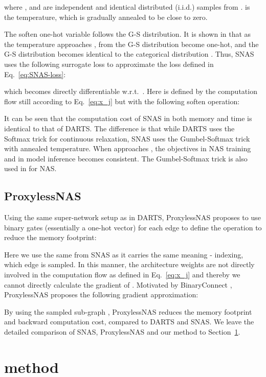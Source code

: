 \documentclass{article}
\newcommand{\neqref}{Eq.~\eqref}
\newcommand{\secref}{Section~\ref}
\begin{document}
where , and  are independent and identical distributed (i.i.d.) samples from .  is the temperature, which is gradually annealed to be close to zero.

The soften one-hot variable  follows the G-S distribution.
It is shown in \cite{Jang2016Categorical} that as the temperature  approaches ,  from the G-S distribution become one-hot, and the G-S distribution becomes identical to the categorical distribution . Thus, SNAS uses the following surrogate loss to approximate the loss defined in \neqref{eq:SNAS-loss}:

which becomes directly differentiable w.r.t.~.
Here  is defined by the computation flow still according to \neqref{eq:x_j} but with the following soften operation:



It can be seen that the computation cost of SNAS in both memory and time is identical to that of DARTS.
The difference is that while DARTS uses the Softmax trick for continuous relaxation, SNAS uses the Gumbel-Softmax trick with annealed temperature. When  approaches , the objectives in NAS training and in model inference becomes consistent. The Gumbel-Softmax trick is also used in \cite{wu2019fbnet, dong2019searching} for NAS.

\subsection{ProxylessNAS}
\label{sec:relatedwork:pNAS}
Using the same super-network setup as in DARTS, ProxylessNAS proposes to use binary gates (essentially a one-hot vector)  for each edge to define the operation to reduce the memory footprint:

Here we use the same  from SNAS as it carries the same meaning - indexing, which edge is sampled.
In this manner, the architecture weights  are not directly involved in the computation flow as defined in \neqref{eq:x_j} and thereby we cannot directly calculate the gradient of .
Motivated by BinaryConnect \cite{courbariaux2015binaryconnect}, ProxylessNAS proposes the following gradient approximation:

By using the sampled sub-graph , ProxylessNAS reduces the memory footprint and backward computation cost, compared to DARTS and SNAS.
We leave the detailed comparison of SNAS, ProxylessNAS and our method to \secref{sec:method}.

\section{method}
\label{sec:method}
\end{document}
